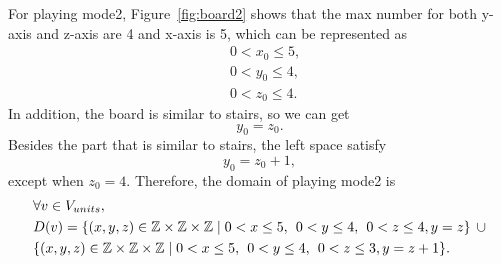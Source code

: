For playing mode2, Figure~\ref{fig:board2} shows that the max number for both y-axis and z-axis are 4 and x-axis is 5, which can be represented as 
\begin{equation}
\begin{aligned}
&0<x_{0}\leq5,\\
&0<y_{0}\leq4,\\
&0<z_{0}\leq4.
\end{aligned}
\end{equation}
In addition, the board is similar to stairs, so we can get
\begin{equation}
y_{0}=z_{0}.
\end{equation}
Besides the part that is similar to stairs, the left space satisfy 
\begin{equation}
y_{0}=z_{0}+1,
\end{equation}
except when $z_{0}=4$.
Therefore, the domain of playing mode2 is
\begin{equation}
\begin{aligned}
&\forall v \in V_{units},\\
&D(v)=\{(x,y,z) \in \mathbb{Z} \times \mathbb{Z}	\times \mathbb{Z} \mid  0<x \leq 5 , \hspace{1ex} 0<y \leq 4,\hspace{1ex} 0<z \leq 4,y=z\} \hspace{1ex}\cup\\
&\{(x,y,z) \in \mathbb{Z} \times \mathbb{Z}	\times \mathbb{Z} \mid  0<x \leq 5, \hspace{1ex} 0<y \leq 4,\hspace{1ex} 0<z \leq 3,y=z+1\}.
\end{aligned}
\end{equation}

